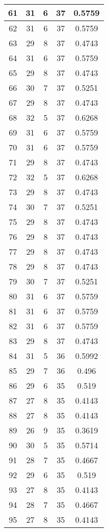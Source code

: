 \documentclass[letterpaper, 12pt]{article}
\begin{document}
\begin{longtable}{|c|c|c|c|c|}
61 & 31 & 6 & 37 & 0.5759 \\
\hline
62 & 31 & 6 & 37 & 0.5759 \\
\hline
63 & 29 & 8 & 37 & 0.4743 \\
\hline
64 & 31 & 6 & 37 & 0.5759 \\
\hline
65 & 29 & 8 & 37 & 0.4743 \\
\hline
66 & 30 & 7 & 37 & 0.5251 \\
\hline
67 & 29 & 8 & 37 & 0.4743 \\
\hline
68 & 32 & 5 & 37 & 0.6268 \\
\hline
69 & 31 & 6 & 37 & 0.5759 \\
\hline
70 & 31 & 6 & 37 & 0.5759 \\
\hline
71 & 29 & 8 & 37 & 0.4743 \\
\hline
72 & 32 & 5 & 37 & 0.6268 \\
\hline
73 & 29 & 8 & 37 & 0.4743 \\
\hline
74 & 30 & 7 & 37 & 0.5251 \\
\hline
75 & 29 & 8 & 37 & 0.4743 \\
\hline
76 & 29 & 8 & 37 & 0.4743 \\
\hline
77 & 29 & 8 & 37 & 0.4743 \\
\hline
78 & 29 & 8 & 37 & 0.4743 \\
\hline
79 & 30 & 7 & 37 & 0.5251 \\
\hline
80 & 31 & 6 & 37 & 0.5759 \\
\hline
81 & 31 & 6 & 37 & 0.5759 \\
\hline
82 & 31 & 6 & 37 & 0.5759 \\
\hline
83 & 29 & 8 & 37 & 0.4743 \\
\hline
84 & 31 & 5 & 36 & 0.5992 \\
\hline
85 & 29 & 7 & 36 & 0.496 \\
\hline
86 & 29 & 6 & 35 & 0.519 \\
\hline
87 & 27 & 8 & 35 & 0.4143 \\
\hline
88 & 27 & 8 & 35 & 0.4143 \\
\hline
89 & 26 & 9 & 35 & 0.3619 \\
\hline
90 & 30 & 5 & 35 & 0.5714 \\
\hline
91 & 28 & 7 & 35 & 0.4667 \\
\hline
92 & 29 & 6 & 35 & 0.519 \\
\hline
93 & 27 & 8 & 35 & 0.4143 \\
\hline
94 & 28 & 7 & 35 & 0.4667 \\
\hline
95 & 27 & 8 & 35 & 0.4143 \\

\end{longtable}
\end{document}
